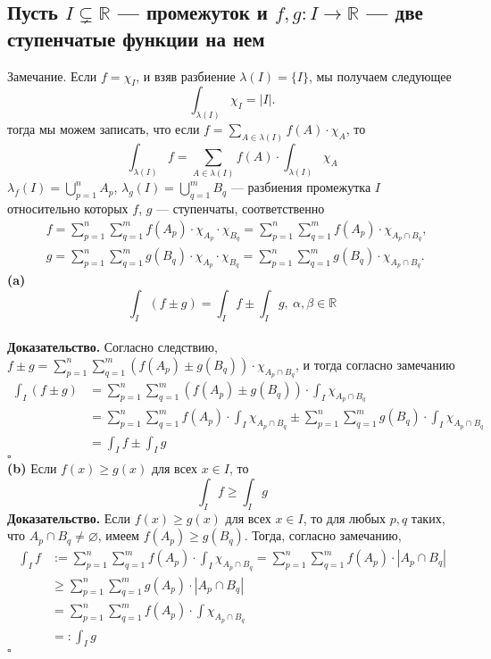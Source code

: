 \documentclass[a4paper]{article}
\newcommand{\qed}{\hfill$\square$}
\begin{document}
\subsection{Пусть $I\subsetneq\mathbb{R}$ — промежуток и $f,g:I\rightarrow\mathbb{R}$ — две ступенчатые функции на нем}
\label{2.12}
$\boxed{\text{Замечание.}}$ Если $f = \chi_I$, и взяв разбиение $\lambda(I) = \{I\}$, мы получаем следующее
$$
\int_{\lambda(I)}\chi_I = |I|.
$$
 тогда мы можем записать, что если $f = \displaystyle\sum_{A \in \lambda(I)}f(A) \cdot \chi_A$, то
$$
\boxed{
\int_{\lambda(I)}f = \sum_{A \in \lambda(I)} f(A) \cdot \int_{\lambda(I)}\chi_A
}
$$
 $\lambda_f(I)  =  \displaystyle\bigcup_{p=1}^n A_p$, $\lambda_g(I) =  \displaystyle\bigcup_{q=1}^m B_q$ — разбиения промежутка $I$ относительно которых $f$, $g$ — ступенчаты, соответственно
$$\begin{aligned}
& f =  \sum_{p=1}^n\sum_{q=1}^m f(A_p) \cdot \chi_{A_p}\cdot \chi_{B_q} = \sum_{p=1}^n\sum_{q=1}^m f(A_p) \cdot \chi_{A_p\cap B_q}, \\
& g=  \sum_{p=1}^n\sum_{q=1}^m g(B_q) \cdot \chi_{A_p} \cdot \chi_{B_q} = \sum_{p=1}^n\sum_{q=1}^m g(B_q) \cdot \chi_{A_p\cap B_q}.
\end{aligned}$$
\indent\textbf{(a)} $$\displaystyle\int_I(f\pm g)=\int_I f\pm\int_I g,\ \alpha,\beta\in\mathbb{R}$$\\[2mm]
\indent\textbf{Доказательство.} Согласно следствию, $f\pm g = \sum_{p=1}^n\sum_{q=1}^m (f(A_p) \pm g(B_q)) \cdot \chi_{A_p\cap B_q}$, и тогда согласно замечанию
$$\begin{aligned}
\int_I (f\pm g) &= \sum_{p=1}^n\sum_{q=1}^m (f(A_p) \pm g(B_q)) \cdot \int_I \chi_{A_p \cap B_q} \\
&=\sum_{p=1}^n\sum_{q=1}^m f(A_p) \cdot \int_I \chi_{A_p \cap B_q} \pm \sum_{p=1}^n\sum_{q=1}^m g(B_q) \cdot \int_I \chi_{A_p \cap B_q} \\
&= \int_I f \pm \int_I g
\end{aligned}$$\qed\\[4mm]
\indent\textbf{(b)} Если $f(x) \ge g(x)$ для всех $x \in I$, то
$$
\int_I f \ge \int_I g
$$
\indent\textbf{Доказательство.} Если $f(x) \ge g(x)$ для всех $x\in I$, то для любых $p,q$ таких, что $A_p \cap B_q \ne \varnothing$, имеем $f(A_p) \ge g(B_q)$. Тогда, согласно замечанию,
$$\begin{aligned}
\int_I f &:=  \sum_{p=1}^n\sum_{q=1}^m f(A_p) \cdot \int_I \chi_{A_p \cap B_q} = \sum_{p=1}^n\sum_{q=1}^m f(A_p) \cdot |A_p \cap B_q| \\
&\geqslant  \sum_{p=1}^n\sum_{q=1}^m g(A_p) \cdot |A_p \cap B_q| \\
&= \sum_{p=1}^n\sum_{q=1}^m f(A_p) \cdot \int \chi_{A_p \cap B_q} \\
&=: \int_I g
\end{aligned}$$\qed\\[4mm]
\end{document}
